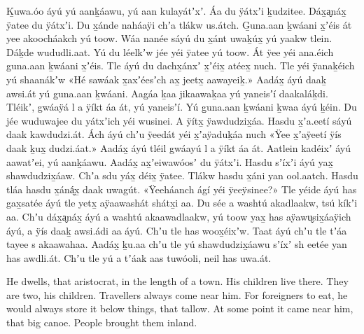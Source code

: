 \clearpage
\begin{pairs}
\begin{Leftside}
\beginnumbering
\pstart
\noindent
{}Ḵuwa.óo áyú yú aanḵáawu, yú aan kulayátʼxʼ.
Áa du ÿátxʼi ḵudzitee.
Dáx̱a̬náx̱ ÿatee du ÿátxʼi.
Du x̱ánde naháaÿi chʼa tlákw us.átch.
G̱una.aan ḵwáani x̱ʼéis át yee akoocháakch yú toow.
Wáa nanée sáyú du x̱ánt uwaḵúx̱ yú yaakw tlein.
Dáḵde wududli.aat.
Yú du léelkʼw jée yéi ÿatee yú toow.
Át ÿee yéi ana.éich g̱una.aan ḵwáani x̱ʼéis.
Tle áyú du dachx̱ánxʼ x̱ʼéix̱ atéex̱ nuch.
Tle yéi ÿanaḵéich yú shaanákʼw
«\!Hé sawáak x̱a\-xʼéesʼch ax̱ jeetx̱ aawayeiḵ.\!»
\pend
\pstart
\hspace{-0.5em}Aadáx̱ áyú daaḵ awsi.át yú g̱una.aan ḵwáa\-ni.
Aag̱áa ḵaa jikaawaḵaa yú yaneisʼí daa\-kaláḵdi.
Tléikʼ, gwáaÿá l a ÿíkt áa át, yú yaneisʼí.
Yú g̱una.aan ḵwáani ḵwaa áyú ḵéin.
Du jée wuduwajee du yátxʼich yéi wusinei.
A ÿítx̱ ÿawdudzix̱áa.
Hasdu x̱ʼa.eetí sáyú daak kawdudzi.át.
Ách áyú chʼu ÿeedát yéi x̱ʼaÿaduḵáa nuch
«\!Ÿee x̱ʼaÿeetí ÿís daak ḵux̱ dudzi.áat.\!»
Aadáx̱ áyú tléil gwáayú l a ÿíkt áa át.
Aatlein kadéixʼ áyú aawatʼei, yú aanḵáawu.
Aadáx̱ ax̱ʼeiwawóosʼ du ÿátxʼi.
Hasdu sʼíxʼi áyú yax̱ shawdudzix̱áaw.
Chʼa sdu yáx̱ déix̱ ÿatee.
Tlákw hasdu x̱áni yan ool.aatch.
Has\-du tláa hasdu x̱áná̬x̱ daak uwagút.
«\!Ÿeeháanch ágí yéi ÿeeÿsinee?\!»
Tle yéide áyú has gax̱satée áyú tle yetx̱ aÿaa\-washát shátx̱i aa.
Du sée a washtú aka\-dlaakw, tsú kíkʼi aa.
Chʼu dáx̱a̬náx̱ áyú a washtú akaawadlaakw, yú toow yax̱ has aÿawu̬six̱áaÿich áyú, a ÿís daaḵ awsi.ádi aa áyú.
Chʼu tle has woox̱éixʼw.
Taat áyú chʼu tle tʼáa tayee s akaawahaa.
Aadáx̱ ḵu.aa chʼu tle yú shawdudzix̱áawu sʼíxʼ sh eetée yan has awdli.át.
Chʼu tle yú a tʼáak aas tuwóoli, neil has uwa.át.
\pend
\endnumbering
\end{Leftside}
\begin{Rightside}
\beginnumbering
\pstart
\noindent
{}He dwells, that aristocrat, in the length of a town.
His children live there.
They are two, his children.
Travellers always come near him.
For foreigners to eat, he would always store it below things, that tallow.
At some point it came near him, that big canoe.
People brought them inland.

\end{Rightside}
\end{pairs}
